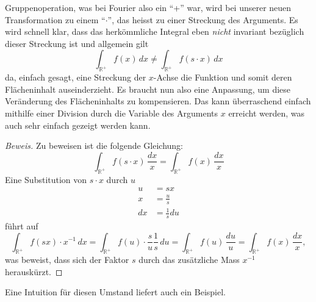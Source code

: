 Gruppenoperation, was bei Fourier also ein ``+'' war, wird bei 
unserer neuen Transformation zu einem ``$\cdot$'', das heisst zu 
einer Streckung des Arguments. 
Es wird schnell klar, dass das herkömmliche Integral eben {\em nicht} 
invariant bezüglich dieser Streckung ist und allgemein gilt 
\begin{equation}
    \int_\mathbb{R^+} 
    f(x)\,{d}x \neq \int_\mathbb{R^+} f(s \cdot x)\,{d}x
    \label{mellin:ungl}
\end{equation}
da, einfach gesagt, eine Streckung der $x$-Achse die Funktion und 
somit deren Flächeninhalt auseinderzieht.
Es braucht nun also eine Anpassung, um diese Veränderung des 
Flächeninhalts zu kompensieren.
Das kann überraschend einfach mithilfe einer Division durch die 
Variable des Arguments $x$ erreicht werden, was auch sehr einfach 
gezeigt werden kann.
\begin{proof}[Beweis]
    Zu beweisen ist die folgende Gleichung:
    \[
        \int_\mathbb{R^+} f(s \cdot x)\,\frac{{d}x}{x} 
        = \int_\mathbb{R^+} f(x)\,\frac{{d}x}{x}
    \]
    Eine Substitution von $s \cdot x$ durch $u$
    \begin{align*}
        u &= sx \\
        x &= \frac{u}{s} \\
        {d}x &= \frac{1}{s} {d}u
    \end{align*}
    führt auf
    \[
        \int_\mathbb{R^+} f(sx) \cdot x^{-1}\,{d}x 
        = \int_\mathbb{R^+} f(u) \cdot \frac{s}{u} \frac{1}{s}\,{d}u
        = \int_\mathbb{R^+} f(u)\,\frac{{d}u}{u}
        = \int_\mathbb{R^+} f(x)\,\frac{{d}x}{x}
        ,
    \]
    was beweist, dass sich der Faktor $s$ durch das zusätzliche Mass 
    $x^{-1}$ herauskürzt.
\end{proof}
Eine Intuition für diesen Umstand liefert auch ein Beispiel.
